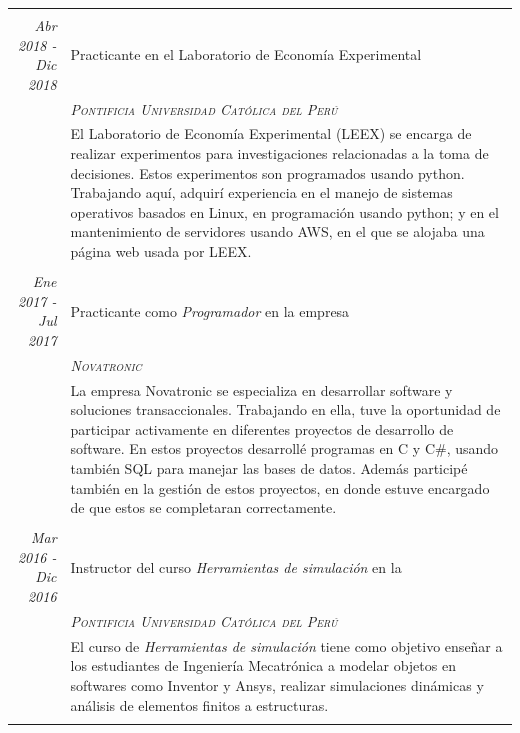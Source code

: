 \documentclass[a4paper,10pt]{article}
\begin{document}
\begin{longtable}{r|p{11cm}}
\\&\\
  \emph{Abr 2018 - Dic 2018} & Practicante en el Laboratorio de Economía Experimental \\&\emph{\textsc{Pontificia Universidad Católica del Per\'u}}\\&\footnotesize{El Laboratorio de Economía Experimental (LEEX) se encarga de realizar experimentos para investigaciones relacionadas a la toma de decisiones. Estos experimentos son programados usando python. Trabajando aquí, adquirí experiencia en el manejo de sistemas operativos basados en Linux, en programación usando python; y en el mantenimiento de servidores usando AWS, en el que se alojaba una página web usada por LEEX.}\\&\\
  
  \emph{Ene 2017 - Jul 2017} & Practicante como  \emph{Programador} en la empresa \\&\emph{\textsc{Novatronic}}\\&\footnotesize{La empresa Novatronic se especializa en desarrollar software y soluciones transaccionales. Trabajando en ella, tuve la oportunidad de participar activamente en diferentes proyectos de desarrollo de software. En estos proyectos desarrollé programas en C y C\#, usando también SQL para manejar las bases de datos. Además participé también en la gestión de estos proyectos, en donde estuve encargado de que estos se completaran correctamente.}\\&\\

 \emph{Mar 2016 - Dic 2016} & Instructor del curso \emph{Herramientas de simulación} en la \\&\emph{\textsc{Pontificia Universidad Católica del Perú}}\\&\footnotesize{El curso de \emph{Herramientas de simulación} tiene como objetivo enseñar a los estudiantes de Ingeniería Mecatrónica a modelar objetos en softwares como Inventor y Ansys, realizar simulaciones dinámicas y análisis de elementos finitos a estructuras.
 }\\&\\
\end{longtable}


\end{document}
